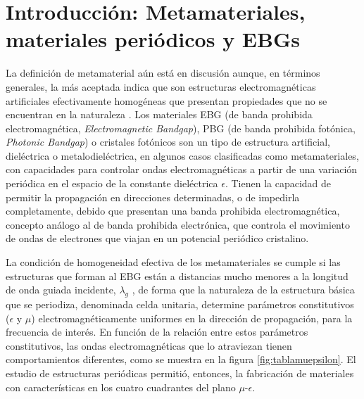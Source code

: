 
\section{Introducción: Metamateriales, materiales periódicos y EBGs}
\label{sec_resenia_metamateriales}


La definición de metamaterial aún está en discusión aunque, en términos generales, la más aceptada indica que son estructuras electromagnéticas artificiales efectivamente homogéneas que presentan propiedades que no se encuentran en la naturaleza \cite{Caloz:ElectromagneticMetamaterials}. Los materiales EBG (de banda prohibida electromagnética, \textit{Electromagnetic Bandgap}), PBG (de banda prohibida fotónica, \textit{Photonic Bandgap}) o cristales fotónicos son un tipo de estructura artificial, dieléctrica o metalodieléctrica, en algunos casos clasificadas como metamateriales, con capacidades para controlar ondas electromagnéticas \cite{Engheta} a partir de una variación periódica en el espacio de la constante dieléctrica $\epsilon$. Tienen la capacidad de permitir la propagación en direcciones determinadas, o de impedirla completamente, debido que presentan una banda prohibida electromagnética, concepto análogo al de banda prohibida electrónica, que controla el movimiento de ondas de electrones que viajan en un potencial periódico cristalino.

La condición de homogeneidad efectiva de los metamateriales se cumple si las estructuras que forman al EBG están a distancias mucho menores a la longitud de onda guiada incidente, $\lambda_g$ \cite{Caloz:ElectromagneticMetamaterials}, de forma que la naturaleza de la estructura básica que se periodiza, denominada celda unitaria, determine parámetros constitutivos ($\epsilon$ y $\mu$) electromagnéticamente uniformes en la dirección de propagación, para la frecuencia de interés. En función de la relación entre estos parámetros constitutivos, las ondas electromagnéticas que lo atraviezan tienen comportamientos diferentes, como se muestra en la figura \ref{fig:tablamuepsilon}. El estudio de estructuras periódicas permitió, entonces, la fabricación de materiales con características en los cuatro cuadrantes del plano $\mu$-$\epsilon$.

